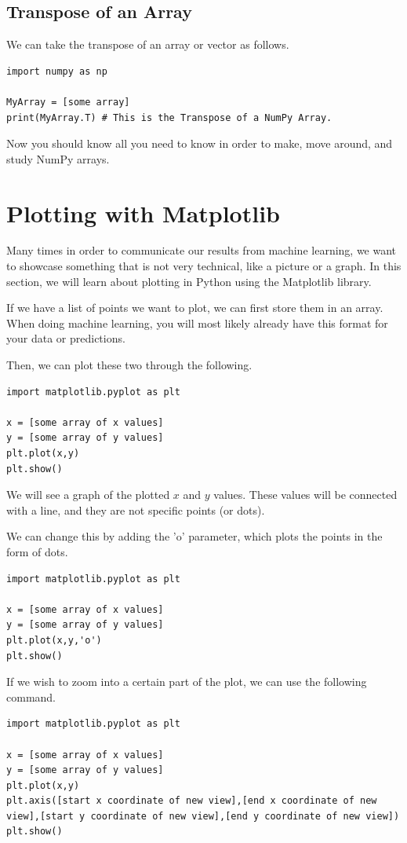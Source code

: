 \documentclass{article}
\begin{document}
\subsection{Transpose of an Array}
We can take the transpose of an array or vector as follows. 
\begin{lstlisting}
import numpy as np

MyArray = [some array]
print(MyArray.T) # This is the Transpose of a NumPy Array.
\end{lstlisting}
Now you should know all you need to know in order to make, move around, and study NumPy arrays.
\section{Plotting with Matplotlib}
Many times in order to communicate our results from machine learning, we want to showcase something that is not very technical, like a picture or a graph. In this section, we will learn about plotting in Python using the Matplotlib library. 

If we have a list of points we want to plot, we can first store them in an array. When doing machine learning, you will most likely already have this format for your data or predictions. 

Then, we can plot these two through the following.
\begin{lstlisting}
import matplotlib.pyplot as plt

x = [some array of x values]
y = [some array of y values]
plt.plot(x,y)
plt.show()
\end{lstlisting}
We will see a graph of the plotted $x$ and $y$ values. These values will be connected with a line, and they are not specific points (or dots).

We can change this by adding the 'o' parameter, which plots the points in the form of dots. 
\begin{lstlisting}
import matplotlib.pyplot as plt

x = [some array of x values]
y = [some array of y values]
plt.plot(x,y,'o')
plt.show()
\end{lstlisting}

If we wish to zoom into a certain part of the plot, we can use the following command.
\begin{lstlisting}
import matplotlib.pyplot as plt

x = [some array of x values]
y = [some array of y values]
plt.plot(x,y)
plt.axis([start x coordinate of new view],[end x coordinate of new view],[start y coordinate of new view],[end y coordinate of new view])
plt.show()
\end{lstlisting}
\end{document}
